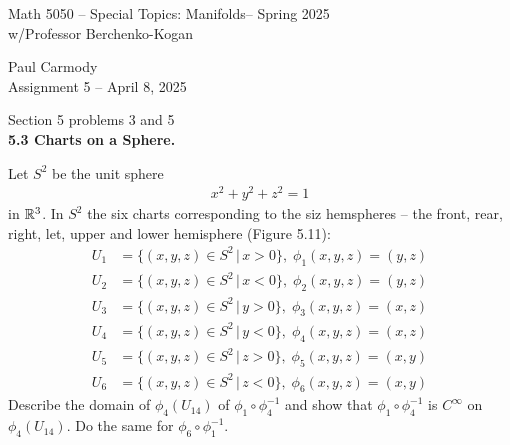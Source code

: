\documentclass[10pt,a4paper]{report}
\newcommand{\CLASSNAME}{Math 5050 -- Special Topics: Manifolds}
\newcommand{\STUDENTNAME}{Paul Carmody}
\newcommand{\ASSIGNMENT}{Assignment 5 }
\newcommand{\DUEDATE}{April 8, 2025}
\newcommand{\SEMESTER}{Spring 2025}
\begin{document}
\begin{center}
	\Large{\CLASSNAME -- \SEMESTER} \\
	\large{ w/Professor Berchenko-Kogan}
\end{center}
\begin{center}
	\STUDENTNAME \\
	\ASSIGNMENT -- \DUEDATE\\
\end{center} 

\noindent Section 5 problems 3 and 5 \\

\noindent\textbf{5.3 Charts on a Sphere.}

Let $S^2$ be the unit sphere 
\begin{align*}
	x^2+y^2+z^2=1
\end{align*}in $\mathbb{R}^3$.  	In $S^2$ the six charts corresponding to the siz hemspheres -- the front, rear, right, let, upper and lower hemisphere (Figure 5.11):
\begin{align*}
	U_1 &= \{(x,y,z) \in S^2\,|\, x > 0\}, \; \phi_1(x,y,z) = (y,z) \\
	U_2 &= \{(x,y,z) \in S^2\,|\, x < 0\}, \; \phi_2(x,y,z) = (y,z) \\
	U_3 &= \{(x,y,z) \in S^2\,|\, y > 0\}, \; \phi_3(x,y,z) = (x,z) \\
	U_4 &= \{(x,y,z) \in S^2\,|\, y < 0\}, \; \phi_4(x,y,z) = (x,z) \\
	U_5 &= \{(x,y,z) \in S^2\,|\, z > 0\}, \; \phi_5(x,y,z) = (x,y) \\
	U_6 &= \{(x,y,z) \in S^2\,|\, z < 0\}, \; \phi_6(x,y,z) = (x,y) 
\end{align*}Describe the domain of $\phi_4(U_{14})$ of $\phi_1\circ \phi_4^{-1}$ and show that $\phi_1\circ\phi_4^{-1}$ is $ C^\infty$ on $\phi_4(U_{14})$.  Do the same for $\phi_6\circ \phi_1^{-1}$.
\end{document}
